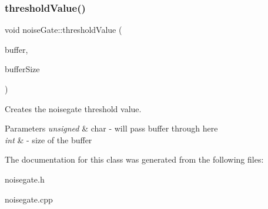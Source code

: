 \subsubsection{\texorpdfstring{threshold\+Value()}{thresholdValue()}}
{\footnotesize\ttfamily void noise\+Gate\+::threshold\+Value (\begin{DoxyParamCaption}\item[{unsigned char $\ast$}]{buffer,  }\item[{int}]{buffer\+Size }\end{DoxyParamCaption})}

Creates the noisegate threshold value. 
\begin{DoxyParams}{Parameters}
{\em unsigned} & char -\/ will pass buffer through here \\
\hline
{\em int} & -\/ size of the buffer \\
\hline
\end{DoxyParams}


The documentation for this class was generated from the following files\+:\begin{DoxyCompactItemize}
\item 
noisegate.\+h\item 
noisegate.\+cpp\end{DoxyCompactItemize}
